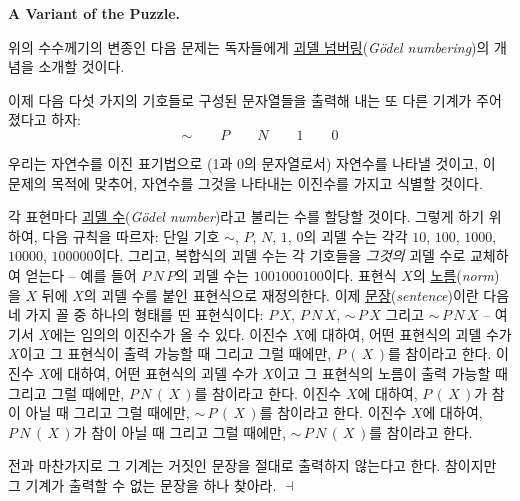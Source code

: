 \documentclass[12pt]{paper}
\newenvironment{context}[1][]
{ \noindent \textbf{{#1}.}
}
{ \hfill $ \dashv $ }
\begin{document}
\begin{context}[A Variant of the Puzzle]
위의 수수께기의 변종인 다음 문제는 독자들에게 \underline{괴델 넘버링}(\textit{G\"odel numbering})의 개념을 소개할 것이다.

이제 다음 다섯 가지의 기호들로 구성된 문자열들을 출력해 내는 또 다른 기계가 주어졌다고 하자:
$$ \sim \qquad P \qquad N \qquad 1 \qquad 0 $$

우리는 자연수를 이진 표기법으로 (1과 0의 문자열로서) 자연수를 나타낼 것이고,
이 문제의 목적에 맞추어, 자연수를 그것을 나타내는 이진수를 가지고 식별할 것이다.

각 표현마다 \underline{괴델 수}(\textit{G\"odel number})라고 불리는 수를 할당할 것이다.
그렇게 하기 위하여, 다음 규칙을 따르자:
단일 기호 $\sim$, $P$, $N$, $1$, $0$의 괴델 수는 각각 $10$, $100$, $1000$, $10000$, $100000$이다.
그리고, 복합식의 괴델 수는 각 기호들을 \textit{그것의} 괴델 수로 교체하여 얻는다 --
예를 들어 $P \, N \, P$의 괴델 수는 $1001000100$이다.
표현식 $X$의 \underline{노름}(\textit{norm})을 $X$ 뒤에 $X$의 괴델 수를 붙인 표현식으로 재정의한다.
이제 \underline{문장}(\textit{sentence})이란 다음 네 가지 꼴 중 하나의 형태를 띤 표현식이다:
$P \, X$, $P \, N \, X$, $\sim \, P \, X$ 그리고 $\sim \, P \, N \, X$ --
여기서 $X$에는 임의의 이진수가 올 수 있다.
이진수 $X$에 대하여, 어떤 표현식의 괴델 수가 $X$이고 그 표현식이 출력 가능할 때 그리고 그럴 때에만,
$P \, \left( \, X \, \right)$를 참이라고 한다.
이진수 $X$에 대하여, 어떤 표현식의 괴델 수가 $X$이고 그 표현식의 노름이 출력 가능할 때 그리고 그럴 때에만,
$P \, N \, \left( \, X \, \right)$를 참이라고 한다.
이진수 $X$에 대하여, $P \, \left( \, X \, \right)$가 참이 아닐 때 그리고 그럴 때에만,
$\sim \, P \, \left( \, X \, \right)$를 참이라고 한다.
이진수 $X$에 대하여, $P \, N \, \left( \, X \, \right)$가 참이 아닐 때 그리고 그럴 때에만,
$\sim \, P \, N \, \left( \, X \, \right)$를 참이라고 한다.

전과 마찬가지로 그 기계는 거짓인 문장을 절대로 출력하지 않는다고 한다.
참이지만 그 기계가 출력할 수 없는 문장을 하나 찾아라.
\end{context}
\end{document}
